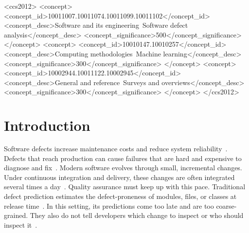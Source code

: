 \documentclass[sigconf,review]{acmart}
\begin{document}
\begin{CCSXML}
<ccs2012>
 <concept>
  <concept_id>10011007.10011074.10011099.10011102</concept_id>
  <concept_desc>Software and its engineering~Software defect analysis</concept_desc>
  <concept_significance>500</concept_significance>
 </concept>
 <concept>
  <concept_id>10010147.10010257</concept_id>
  <concept_desc>Computing methodologies~Machine learning</concept_desc>
  <concept_significance>300</concept_significance>
 </concept>
 <concept>
  <concept_id>10002944.10011122.10002945</concept_id>
  <concept_desc>General and reference~Surveys and overviews</concept_desc>
  <concept_significance>300</concept_significance>
 </concept>
</ccs2012>
\end{CCSXML}



\maketitle

\section{Introduction}
\label{S:introduction}

Software defects increase maintenance costs and reduce system reliability~\cite{boehm2001software}. Defects that reach production can cause failures that are hard and expensive to diagnose and fix~\cite{tassey2002economic}. Modern software evolves through small, incremental changes. Under continuous integration and delivery, these changes are often integrated several times a day~\cite{hilton2016usage, shahin2017continuous}. Quality assurance must keep up with this pace. Traditional defect prediction estimates the defect-proneness of modules, files, or classes at release time~\cite{hall2012systematic, radjenovic2013software}. In this setting, its predictions come too late and are too coarse-grained. They also do not tell developers which change to inspect or who should inspect it~\cite{kamei2013large}.
\end{document}
